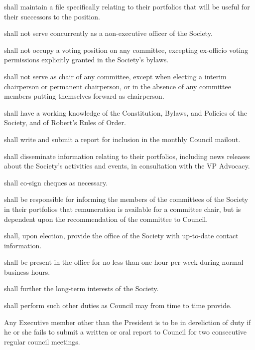 \begin{longenum}[ label*=\thesection.\arabic*., align=left]
    \item shall maintain a file specifically relating to their portfolios that will be useful for their successors to the position.
    \item shall not serve concurrently as a non-executive officer of the Society.
    \item shall not occupy a voting position on any committee, excepting ex-officio voting permissions explicitly granted in the Society's bylaws.
    \begin{longenum}[ label*=\arabic*., align=left]
		\item shall not serve as chair of any committee, except when electing a interim chairperson or permanent chairperson, or in the absence of any committee members putting themselves forward as chairperson. 
   	\end{longenum}
    \item shall have a working knowledge of the Constitution, Bylaws, and Policies of the Society, and of Robert's Rules of Order.
    \item shall write and submit a report for inclusion in the monthly Council mailout.
    \item shall disseminate information relating to their portfolios, including news releases about the Society's activities and events, in consultation with the VP Advocacy.
    \item shall co-sign cheques as necessary.  
    \item shall be responsible for informing the members of the committees of the Society in their portfolios that remuneration is available for a committee chair, but is dependent upon the recommendation of the committee to Council.
    \item shall, upon election, provide the office of the Society with up-to-date contact information. 
    \item shall be present in the office for no less than one hour per week during normal business hours.
    \item shall further the long-term interests of the Society.
    \item shall perform such other duties as Council may from time to time provide.
    \item Any Executive member other than the President is to be in dereliction of duty if he or she fails to submit a written or oral report to Council for two consecutive regular council meetings.
\end{longenum}
